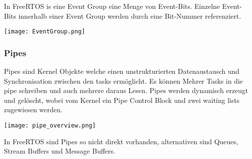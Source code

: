 In FreeRTOS is eine Event Group eine Menge von Event-Bits.
Einzelne Event-Bits innerhalb einer Event Group werden durch eine Bit-Nummer referenziert.

\texttt{[image: EventGroup.png]}

\subsubsection{Pipes}

Pipes sind Kernel Objekte welche einen unstrukturierten Datenaustausch und Synchronisation zwischen den tasks ermöglicht.
Es können Mehrer Tasks in die pipe schreiben und auch mehrere daraus Lesen.
Pipes werden dynamisch erzeugt und gelöscht, wobei vom Kernel ein Pipe Control Block und zwei waiting lists zugewiesen werden.

\texttt{[image: pipe\_overview.png]}

In FreeRTOS sind Pipes so nicht direkt vorhanden, alternativen sind Queues, Stream Buffers und Message Buffers.